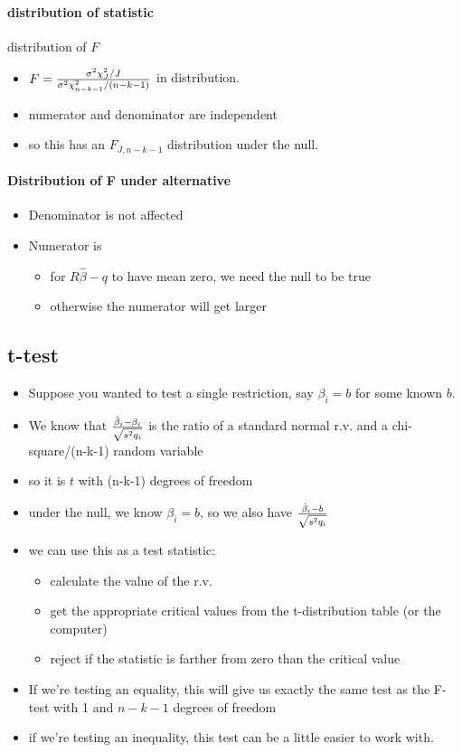 \paragraph{distribution of statistic}
       distribution of $F$
\begin{itemize}
\item $F = {\sigma^2 \chi_J^2 / J \over \sigma^2 \chi_{n-k-1}^2 /
         (n-k-1)}$ in distribution.
\item numerator and denominator are independent
\item so this has an $F_{J, n-k-1}$ distribution under the null.
\end{itemize}

\paragraph{Distribution of F under alternative}
\begin{itemize}
\item Denominator is not affected
\item Numerator is
\begin{itemize}
\item for $R\hat\beta - q$ to have mean zero, we need the null to
          be true
\item otherwise the numerator will get larger
\end{itemize}
\end{itemize}

\subsection{t-test}

\begin{itemize}
\item Suppose you wanted to test a single restriction, say $\beta_i =
       b$ for some known $b$.
\item We know that ${\hat\beta_i - \beta_i \over \sqrt{s^2 q_i}}$ is
       the ratio of a standard normal r.v. and a chi-square/(n-k-1)
       random variable
\item so it is $t$ with (n-k-1) degrees of freedom
\item under the null, we know $\beta_i = b$, so we also have
       ${\hat\beta_i - b \over \sqrt{s^2 q_i}}$
\item we can use this as a test statistic:
\begin{itemize}
\item calculate the value of the r.v.
\item get the appropriate critical values from the t-distribution
         table (or the computer)
\item reject if the statistic is farther from zero than the
         critical value
\end{itemize}
\item If we're testing an equality, this will give us exactly the
       same test as the F-test with 1 and $n-k-1$ degrees of freedom
\item if we're testing an inequality, this test can be a little
       easier to work with.
\end{itemize}

